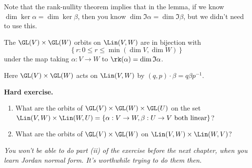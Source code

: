 Note that the rank-nullity theorem implies that in the lemma, if we know $\dim\ker\alpha = \dim\ker\beta$, then you know $\dim\Im\alpha = \dim\Im\beta$, but we didn't need to use this.

\begin{theorem}
	 The $\GL(V)\times\GL(W)$ orbits on $\Lin(V,W)$ are in bijection with %
	\begin{equation*}
		\left\{r:0\leq r\leq \min(\dim V,\dim W)\right\}
	\end{equation*}
	under the map taking $\alpha:V \to W$ to $\rk(\alpha) = \dim\Im\alpha$. %
	
	Here $\GL(V) \times \GL(W)$ acts on $\Lin(V,W)$ by $(q,p)\cdot\beta = q\beta p^{-1}$. %
\end{theorem}

\textbf{Hard exercise.}

\begin{enumerate}
	\shortskip
	\item What are the orbits of $\GL(V) \times \GL(W) \times \GL(U)$ on the set $\Lin(V,W) \times \Lin(W,U) = \left\{\alpha:V\to W,\beta:U\to V \text{ both linear}\right\}$? %
	
	\item What are the orbits of $\GL(V) \times \GL(W)$ on $\Lin(V,W) \times \Lin(W,V)$? %
\end{enumerate}

\emph{You won't be able to do part (ii) of the exercise before the next chapter, when you learn Jordan normal form. It's worthwhile trying to do them then.}


